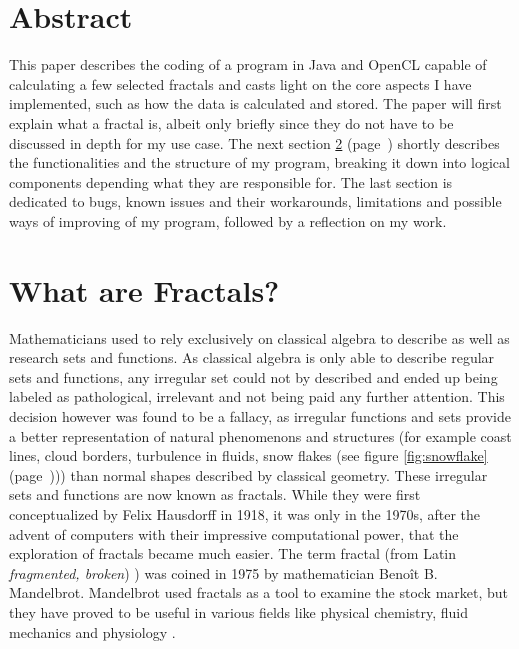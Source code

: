 \documentclass[12pt,a4paper,titlepage]{article}
\begin{document}
	
	\begin{titlepage}
		\null
		\newpage
	\end{titlepage}
	
	\tableofcontents
	\listoffigures
	\clearpage
	\let\oldref\ref
	\renewcommand{\ref}[1]{\oldref{#1} (page~\pageref{#1})}
	
	\section{Abstract}
	This paper describes the coding of a program in Java and OpenCL capable of calculating a few selected fractals and casts light on the core aspects I have implemented, such as how the data is calculated and stored. The paper will first explain what a fractal is, albeit only briefly since they do not have to be discussed in depth for my use case. The next section \ref{sec:fractals} shortly describes the functionalities and the structure of my program, breaking it down into logical components depending what they are responsible for. The last section is dedicated to bugs, known issues and their workarounds, limitations and possible ways of improving of my program, followed by a reflection on my work.
	\section{What are Fractals?}\label{sec:fractals}
	Mathematicians used to rely exclusively on classical algebra to describe as well as research sets and functions. As classical algebra is only able to describe regular sets and functions, any irregular set could not by described and ended up being labeled as pathological, irrelevant and not being paid any further attention. This decision however was found to be a fallacy, as irregular functions and sets provide a better representation of natural phenomenons and structures (for example coast lines, cloud borders, turbulence in fluids, snow flakes (see figure \ref{fig:snowflake})) than normal shapes described by classical geometry. These irregular sets and functions are now known as fractals. 
	While they were first conceptualized by Felix Hausdorff in 1918, it was only in the 1970s, after the advent of computers with their impressive computational power, that the exploration of fractals became much easier. The term fractal (from Latin \emph{fragmented, broken}) ) was coined in 1975 by mathematician Benoît B. Mandelbrot. Mandelbrot used fractals as a tool to examine the stock market, but they have proved to be useful in various fields like physical chemistry, fluid mechanics and physiology \cite{FalconerKennethJ1993FG:m, britannica}.
\end{document}
